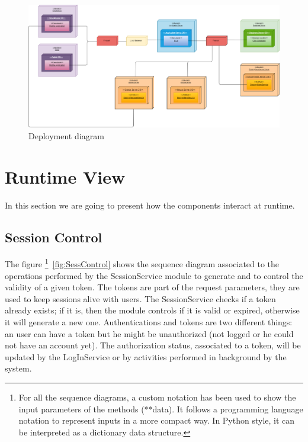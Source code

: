 \begin{figure}[H]
	\centering
	\includegraphics[width=1.0\textwidth]{images/deployment_view.png}
	\caption{Deployment diagram}\label{fig:Deployment diagram}
\end{figure}

\section{Runtime View}

In this section we are going to present how the components interact at runtime.

\subsection{Session Control}

The figure \footnote{For all the sequence diagrams, a custom notation has been used to show the input parameters of the methods (**data). It follows a programming language notation to represent inputs in a more compact way. In Python style, it can be interpreted as a dictionary data structure.}~\ref{fig:SessControl} shows the sequence diagram associated to the operations performed by the SessionService module to generate and to control the validity of a given token. The tokens are part of the request parameters, they are used to keep sessions alive with users. The SessionService checks if a token already exists; if it is, then the module controls if it is valid or expired, otherwise it will generate a new one.
Authentications and tokens are two different things: an user can have a token but he might be unauthorized (not logged or he could not have an account yet). The authorization status, associated to a token, will be updated by the LogInService or by activities performed in background by the system.

